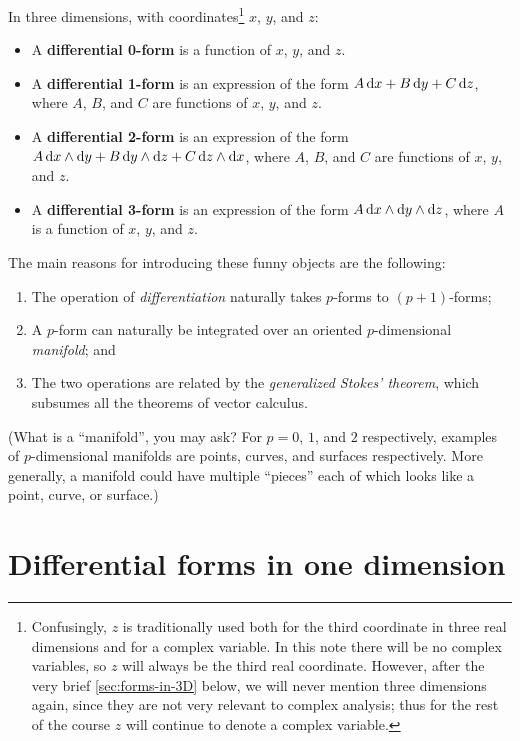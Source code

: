 \documentclass[12pt]{amsart}
\begin{document}
\begin{defn}
  In three dimensions, with coordinates\footnote{Confusingly, $z$ is traditionally used both for the third coordinate in three real dimensions and for a complex variable.  In this note there will be no complex variables, so $z$ will always be the third real coordinate.  However, after the very brief \cref{sec:forms-in-3D} below, we will never mention three dimensions again, since they are not very relevant to complex analysis; thus for the rest of the course $z$ will continue to denote a complex variable.} $x$, $y$, and $z$:
  \begin{itemize}
  \item A \textbf{differential 0-form} is a function of $x$, $y$, and $z$.
  \item A \textbf{differential 1-form} is an expression of the form $A\,{\mathrm{d} x}+B\,{\mathrm{d} y}+C\,{\mathrm{d} z}$, where $A$, $B$, and $C$ are functions of $x$, $y$, and $z$.
  \item A \textbf{differential 2-form} is an expression of the form $A\,{\mathrm{d} x}\wedge{\ensuremath{\mathrm{d} y}} + B \,{\mathrm{d} y}\wedge{\ensuremath{\mathrm{d} z}} + C \,{\mathrm{d} z}\wedge{\ensuremath{\mathrm{d} x}}$, where $A$, $B$, and $C$ are functions of $x$, $y$, and $z$.
  \item A \textbf{differential 3-form} is an expression of the form $A \,{\mathrm{d} x}\wedge{\ensuremath{\mathrm{d} y}}\wedge{\ensuremath{\mathrm{d} z}}$, where $A$ is a function of $x$, $y$, and $z$.
  \end{itemize}
\end{defn}

The main reasons for introducing these funny objects are the following:
\begin{enumerate}
\item The operation of \emph{differentiation} naturally takes $p$-forms to $(p+1)$-forms;
\item A $p$-form can naturally be integrated over an oriented $p$-dimensional \emph{manifold}; and
\item The two operations are related by the \emph{generalized Stokes' theorem}, which subsumes all the theorems of vector calculus.
\end{enumerate}

(What is a ``manifold'', you may ask?
For $p=0$, $1$, and $2$ respectively, examples of $p$-dimensional manifolds are points, curves, and surfaces respectively.
More generally, a manifold could have multiple ``pieces'' each of which looks like a point, curve, or surface.)

\section{Differential forms in one dimension}
\label{sec:forms-in-1D}
\end{document}
